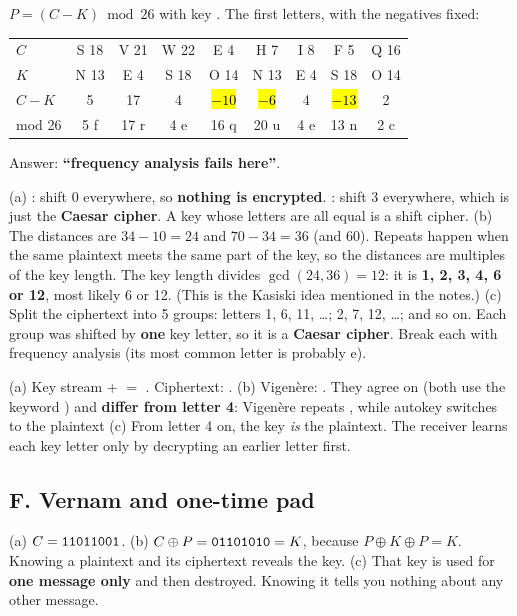 \ans $P = (C - K) \bmod 26$ with key . The first letters, with the negatives fixed:
\begin{center}\small\setlength{\tabcolsep}{4pt}
\begin{tabular}{@{}l*{8}{c}@{}}
\toprule
$C$ & S 18 & V 21 & W 22 & E 4 & H 7 & I 8 & F 5 & Q 16\\
$K$ & N 13 & E 4 & S 18 & O 14 & N 13 & E 4 & S 18 & O 14\\
$C-K$ & 5 & 17 & 4 & \hl{$-10$} & \hl{$-6$} & 4 & \hl{$-13$} & 2\\
mod 26 & 5 f & 17 r & 4 e & 16 q & 20 u & 4 e & 13 n & 2 c\\
\bottomrule
\end{tabular}
\end{center}
Answer: \textbf{``frequency analysis fails here''}.

\ans (a) : shift 0 everywhere, so \textbf{nothing is encrypted}. : shift 3 everywhere, which is just the \textbf{Caesar cipher}. A key whose letters are all equal is a shift cipher.
(b) The distances are $34-10=24$ and $70-34=36$ (and $60$). Repeats happen when the same plaintext meets the same part of the key, so the distances are multiples of the key length. The key length divides $\gcd(24,36) = 12$: it is \textbf{1, 2, 3, 4, 6 or 12}, most likely 6 or 12. (This is the Kasiski idea mentioned in the notes.)
(c) Split the ciphertext into 5 groups: letters 1, 6, 11, \dots; 2, 7, 12, \dots; and so on. Each group was shifted by \textbf{one} key letter, so it is a \textbf{Caesar cipher}. Break each with frequency analysis (its most common letter is probably e).

\ans (a) Key stream  +  $=$ . Ciphertext: \textbf{}.
(b) Vigen\`ere: . They agree on  (both use the keyword ) and \textbf{differ from letter 4}: Vigen\`ere repeats , while autokey switches to the plaintext 
(c) From letter 4 on, the key \emph{is} the plaintext. The receiver learns each key letter only by decrypting an earlier letter first.

\subsection*{F. Vernam and one-time pad}

\ans (a) $C = \texttt{11011001}$.
(b) $C \oplus P = \texttt{01101010} = K$, because $P \oplus K \oplus P = K$. Knowing a plaintext and its ciphertext reveals the key.
(c) That key is used for \textbf{one message only} and then destroyed. Knowing it tells you nothing about any other message.

